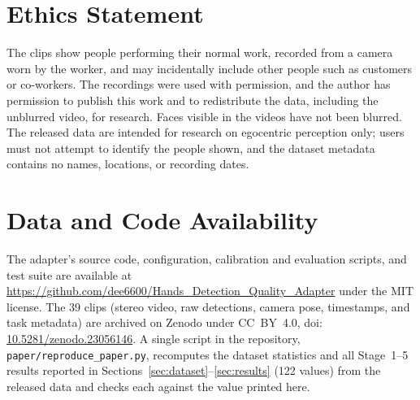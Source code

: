 \documentclass[journal]{IEEEtran}
\newcommand{\RepoURL}{https://github.com/dee6600/Hands_Detection_Quality_Adapter}
\newcommand{\DataDOI}{10.5281/zenodo.23056146}
\begin{document}
\section*{Ethics Statement}
The clips show people performing their normal work, recorded from a camera worn by the worker, and may incidentally include other people such as customers or co-workers. The recordings were used with permission, and the author has permission to publish this work and to redistribute the data, including the unblurred video, for research. Faces visible in the videos have not been blurred. The released data are intended for research on egocentric perception only; users must not attempt to identify the people shown, and the dataset metadata contains no names, locations, or recording dates.

\section*{Data and Code Availability}
The adapter's source code, configuration, calibration and evaluation scripts, and test suite are available at \url{\RepoURL} under the MIT license. The 39 clips (stereo video, raw detections, camera pose, timestamps, and task metadata) are archived on Zenodo under CC~BY~4.0, \mbox{doi:\,\href{https://doi.org/\DataDOI}{\DataDOI}}. A single script in the repository, \texttt{paper/reproduce\_paper.py}, recomputes the dataset statistics and all Stage~1--5 results reported in Sections~\ref{sec:dataset}--\ref{sec:results} (122 values) from the released data and checks each against the value printed here.



\end{document}
